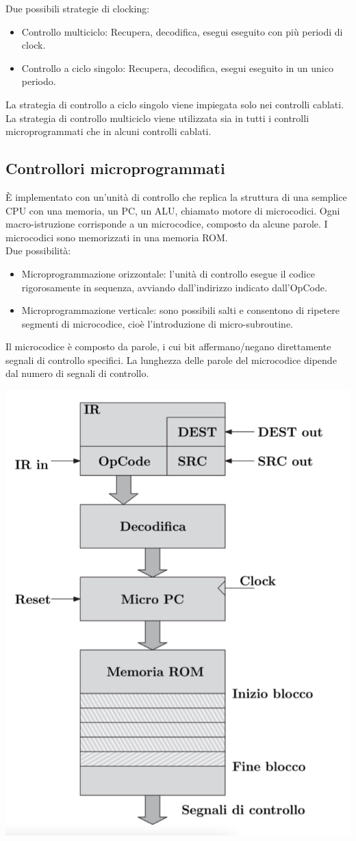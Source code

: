 \documentclass[12pt,a4paper]{article}
\begin{document}
Due possibili strategie di clocking:
\begin{itemize}
\item Controllo multiciclo: Recupera, decodifica, esegui eseguito con più periodi di clock.
\item Controllo a ciclo singolo: Recupera, decodifica, esegui eseguito in un unico periodo.
\end{itemize}
 La strategia di controllo a ciclo singolo viene impiegata solo nei controlli cablati.\\
 La strategia di controllo multiciclo viene utilizzata sia in tutti i controlli microprogrammati che in alcuni controlli cablati.

\subsection{Controllori microprogrammati}
È implementato con un'unità di controllo che replica la struttura di una semplice CPU con una memoria, un PC, un ALU, chiamato motore di microcodici. Ogni macro-istruzione corrisponde a un microcodice, composto da alcune parole. I microcodici sono memorizzati in una memoria ROM.\\
Due possibilità:
\begin{itemize}
\item Microprogrammazione orizzontale: l'unità di controllo esegue il codice rigorosamente in sequenza, avviando dall'indirizzo indicato dall'OpCode.
\item Microprogrammazione verticale: sono possibili salti e consentono di ripetere segmenti di microcodice, cioè l'introduzione di micro-subroutine.
\end{itemize}
Il microcodice è composto da parole, i cui bit affermano/negano direttamente segnali di controllo specifici. La lunghezza delle parole del microcodice dipende dal numero di segnali di controllo.
\begin{center}
\includegraphics[width=0.5\columnwidth]{img/microprogrammed.png}
\end{center}
\end{document}

